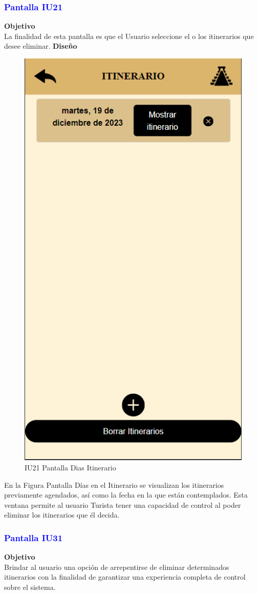 \newpage
\subsubsection{\textcolor{blue}{Pantalla IU21}}
\textbf{Objetivo} \\
La finalidad de esta pantalla es que el Usuario seleccione el o los itinerarios que desee eliminar.
\vspace{15pt}
\textbf{Diseño}
\begin{figure}[htb]
    \centering 
        \includegraphics[width=.5\linewidth]{entregable final/pantallasSistema/IU21 Pantalla Dias Itinerario.png}
    \caption{IU21 Pantalla Dias Itinerario}
\end{figure}


  
En la Figura Pantalla Días en el Itinerario se visualizan los itinerarios previamente agendados, así como la fecha en la que están contemplados. Esta ventana permite al usuario Turista tener una capacidad de control al poder eliminar los itinerarios que él decida.
\newpage

\subsubsection{\textcolor{blue}{Pantalla IU31}}

\textbf{Objetivo} \\
Brindar al usuario una opción de arrepentirse de eliminar determinados itinerarios con la finalidad de garantizar una experiencia completa de control sobre el sistema.
\vspace{15pt}


